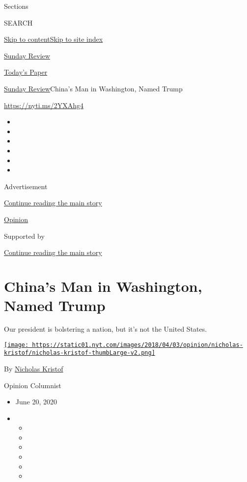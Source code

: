 Sections

SEARCH

\protect\hyperlink{site-content}{Skip to
content}\protect\hyperlink{site-index}{Skip to site index}

\href{https://www.nytimes.com/section/opinion/sunday}{Sunday Review}

\href{https://myaccount.nytimes.com/auth/login?response_type=cookie\&client_id=vi}{}

\href{https://www.nytimes.com/section/todayspaper}{Today's Paper}

\href{/section/opinion/sunday}{Sunday Review}\textbar{}China's Man in
Washington, Named Trump

\href{https://nyti.ms/2YXAhg4}{https://nyti.ms/2YXAhg4}

\begin{itemize}
\item
\item
\item
\item
\item
\item
\end{itemize}

Advertisement

\protect\hyperlink{after-top}{Continue reading the main story}

\href{/section/opinion}{Opinion}

Supported by

\protect\hyperlink{after-sponsor}{Continue reading the main story}

\hypertarget{chinas-man-in-washington-named-trump}{%
\section{China's Man in Washington, Named
Trump}\label{chinas-man-in-washington-named-trump}}

Our president is bolstering a nation, but it's not the United States.

\href{https://www.nytimes.com/column/nicholas-kristof}{\texttt{[image: https://static01.nyt.com/images/2018/04/03/opinion/nicholas-kristof/nicholas-kristof-thumbLarge-v2.png]}}

By \href{https://www.nytimes.com/column/nicholas-kristof}{Nicholas
Kristof}

Opinion Columnist

\begin{itemize}
\item
  June 20, 2020
\item
  \begin{itemize}
  \item
  \item
  \item
  \item
  \item
  \item
  \end{itemize}
\end{itemize}


